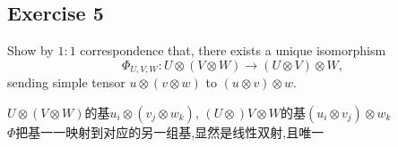 \documentclass[11pt]{ctexart}
\theoremstyle{definition}
\numberwithin{equation}{section}
\theoremstyle{definition}
\theoremstyle{remark}
\begin{document}
\subsection{Exercise 5}
Show by $1:1$ correspondence that, there exists a unique isomorphism
$$
\Phi_{U,V,W} :U \otimes (V \otimes W) \to (U \otimes V) \otimes W,
$$
sending simple tensor $u \otimes (v \otimes w)$ to $(u \otimes v) \otimes w$.
\begin{aaa}
    $U\otimes (V\otimes W)$的基$u_i\otimes (v_j\otimes w_k)$,    $(U\otimes )V\otimes W$的基$(u_i\otimes v_j)\otimes w_k$    \\
    $\Phi$把基一一映射到对应的另一组基,显然是线性双射,且唯一                                                                                                                                                                                                                                                                                                                                                                                                                                                                                                                                                                                                                                                                                                                                                                                                                                                                                                                                                                                                                                                                                                                                                                                                                                                                                                                                                                                                                                                                                                                                                                                                                                                                                                                                                                                                                                                                                                                                                                                                                                                                                                                                                                                                                                                                                                                                                                                                                                                                                                                                                                                                                                                                                               
\end{aaa}
\end{document}
